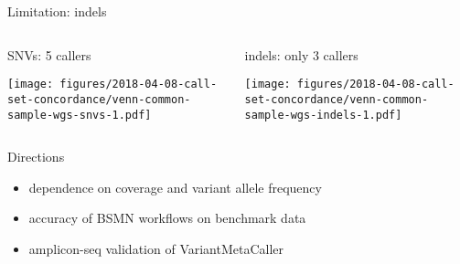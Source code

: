 \documentclass{beamer}
\begin{document}
\begin{frame}{Limitation: indels}
\begin{columns}[t]
\begin{column}{0.5\textwidth}{SNVs: 5 callers}

\texttt{[image: figures/2018-04-08-call-set-concordance/venn-common-sample-wgs-snvs-1.pdf]}
\end{column}

\begin{column}{0.5\textwidth}{indels: only 3 callers}

\texttt{[image: figures/2018-04-08-call-set-concordance/venn-common-sample-wgs-indels-1.pdf]}
\end{column}
\end{columns}
\end{frame}

\begin{frame}{Directions}
\begin{itemize}
\item dependence on coverage and variant allele frequency 
\item accuracy of BSMN workflows on benchmark data
\item amplicon-seq validation of VariantMetaCaller 
\end{itemize}
\end{frame}
\end{document}
